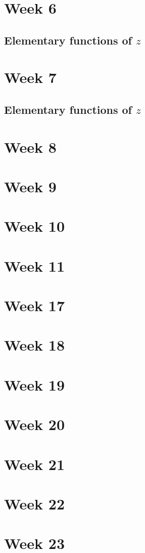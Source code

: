 \documentclass{article}
\begin{document}
\section{Week 6}
\subsection{Elementary functions of $z$}

\section{Week 7}
\subsection{Elementary functions of $z$}

\section{Week 8}

\section{Week 9}

\section{Week 10}

\section{Week 11}

\section{Week 17}

\section{Week 18}

\section{Week 19}

\section{Week 20}

\section{Week 21}

\section{Week 22}

\section{Week 23}
\end{document}
